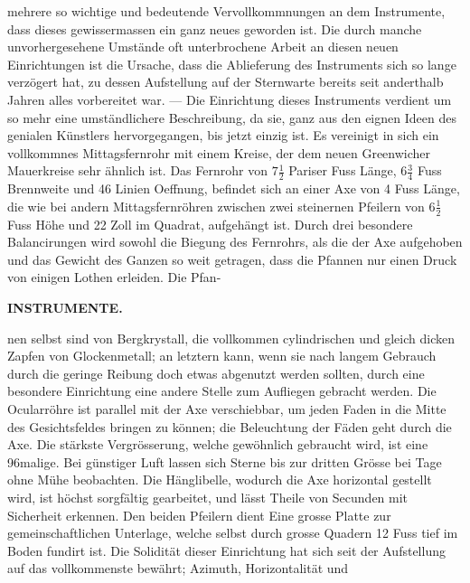 mehrere so wichtige und bedeutende Vervollkommnungen an dem Instrumente, dass dieses gewissermassen ein ganz neues geworden ist. Die durch manche unvorhergesehene Umstände oft unterbrochene Arbeit an diesen neuen Einrichtungen ist die Ursache, dass die Ablieferung des Instruments sich so lange verzögert hat, zu dessen Aufstellung auf der Sternwarte bereits seit anderthalb Jahren alles vorbereitet war. --- Die Einrichtung dieses Instruments verdient um so mehr eine umständlichere Beschreibung, da sie, ganz aus den eignen Ideen des genialen Künstlers hervorgegangen, bis jetzt einzig ist. Es vereinigt in sich ein vollkommnes Mittagsfernrohr mit einem Kreise, der dem neuen Greenwicher Mauerkreise sehr ähnlich ist. Das Fernrohr von $7\frac{1}{2}$ Pariser Fuss Länge, $6\frac{3}{4}$ Fuss Brennweite und 46 Linien Oeffnung, befindet sich an einer Axe von 4 Fuss Länge, die wie bei andern Mittagsfernröhren zwischen zwei steinernen Pfeilern von $6\frac{1}{2}$ Fuss Höhe und 22 Zoll im Quadrat, aufgehängt ist. Durch drei besondere Balancirungen wird sowohl die Biegung des Fernrohrs, als die der Axe aufgehoben und das Gewicht des Ganzen so weit getragen, dass die Pfannen nur einen Druck von einigen Lothen erleiden. Die Pfan-\par
\clearpage
\noindent{}%
\makebox[12mm][l]{}%
\parbox[t]{\dimexpr\linewidth-24mm\relax}{\centering\footnotesize\bfseries INSTRUMENTE.\par}%
\par\nobreak\medskip
\noindent nen selbst sind von Bergkrystall, die vollkommen cylindrischen und gleich dicken Zapfen von
Glockenmetall; an letztern kann, wenn sie nach langem Gebrauch durch die geringe Reibung doch etwas
abgenutzt werden sollten, durch eine besondere Einrichtung eine andere Stelle zum Aufliegen gebracht
werden. Die Ocularröhre ist parallel mit der Axe verschiebbar, um jeden Faden in die Mitte des
Gesichtsfeldes bringen zu können; die Beleuchtung der Fäden geht durch die Axe. Die stärkste
Vergrösserung, welche gewöhnlich gebraucht wird, ist eine 96malige. Bei günstiger Luft lassen sich
Sterne bis zur dritten Grösse bei Tage ohne Mühe beobachten. Die Hänglibelle, wodurch die Axe
horizontal gestellt wird, ist höchst sorgfältig gearbeitet, und lässt Theile von Secunden mit
Sicherheit erkennen. Den beiden Pfeilern dient Eine grosse Platte zur gemeinschaftlichen Unterlage,
welche selbst durch grosse Quadern 12 Fuss tief im Boden fundirt ist. Die Solidität dieser Einrichtung
hat sich seit der Aufstellung auf das vollkommenste bewährt; Azimuth, Horizontalität und
